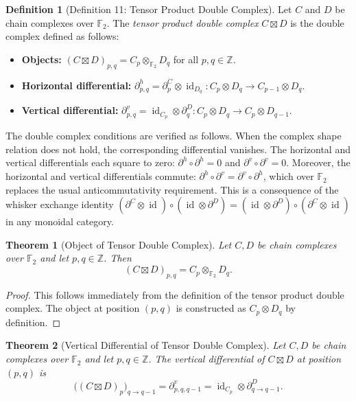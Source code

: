 \documentclass[11pt]{article}
\theoremstyle{plain}
\newtheorem*{theorem}{Theorem}
\theoremstyle{definition}
\newtheorem*{definition}{Definition}
\theoremstyle{remark}
\begin{document}
\begin{definition}[Definition 11: Tensor Product Double Complex]
Let $C$ and $D$ be chain complexes over $\mathbb{F}_2$. The \emph{tensor product double complex} $C \boxtimes D$ is the double complex defined as follows:
\begin{itemize}
\item \textbf{Objects:} $(C \boxtimes D)_{p,q} = C_p \otimes_{\mathbb{F}_2} D_q$ for all $p, q \in \mathbb{Z}$.
\item \textbf{Horizontal differential:} $\partial^h_{p,q} = \partial^C_p \otimes \operatorname{id}_{D_q} : C_p \otimes D_q \to C_{p-1} \otimes D_q$.
\item \textbf{Vertical differential:} $\partial^v_{p,q} = \operatorname{id}_{C_p} \otimes \partial^D_q : C_p \otimes D_q \to C_p \otimes D_{q-1}$.
\end{itemize}
The double complex conditions are verified as follows. When the complex shape relation does not hold, the corresponding differential vanishes. The horizontal and vertical differentials each square to zero: $\partial^h \circ \partial^h = 0$ and $\partial^v \circ \partial^v = 0$. Moreover, the horizontal and vertical differentials commute: $\partial^h \circ \partial^v = \partial^v \circ \partial^h$, which over $\mathbb{F}_2$ replaces the usual anticommutativity requirement. This is a consequence of the whisker exchange identity $(\partial^C \otimes \operatorname{id}) \circ (\operatorname{id} \otimes \partial^D) = (\operatorname{id} \otimes \partial^D) \circ (\partial^C \otimes \operatorname{id})$ in any monoidal category.
\end{definition}

\begin{theorem}[Object of Tensor Double Complex]
Let $C, D$ be chain complexes over $\mathbb{F}_2$ and let $p, q \in \mathbb{Z}$. Then
\[
(C \boxtimes D)_{p,q} = C_p \otimes_{\mathbb{F}_2} D_q.
\]
\end{theorem}

\begin{proof}
This follows immediately from the definition of the tensor product double complex. The object at position $(p,q)$ is constructed as $C_p \otimes D_q$ by definition.
\end{proof}

\begin{theorem}[Vertical Differential of Tensor Double Complex]
Let $C, D$ be chain complexes over $\mathbb{F}_2$ and let $p, q \in \mathbb{Z}$. The vertical differential of $C \boxtimes D$ at position $(p,q)$ is
\[
\bigl((C \boxtimes D)_p\bigr)_{q \to q-1} = \partial^v_{p,q,q-1} = \operatorname{id}_{C_p} \otimes \partial^D_{q \to q-1}.
\]
\end{theorem}
\end{document}
